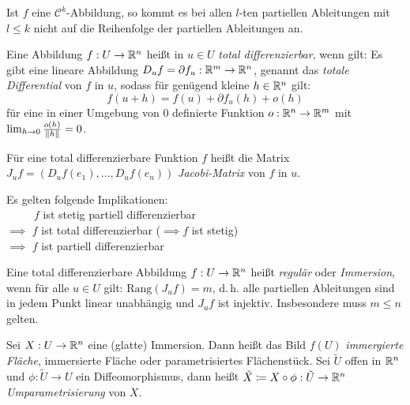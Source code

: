 \documentclass{cheat-sheet}
\begin{document}
\begin{satz}[Schwarz]
  Ist $f$ eine $\mathcal{C}^k$-Abbildung, so kommt es bei allen $l$-ten partiellen Ableitungen mit $l \leq k$ nicht auf die Reihenfolge der partiellen Ableitungen an.
\end{satz}

\begin{defn}
  Eine Abbildung $f : U \to \mathbb{R}^n$ heißt in $u \in U$ \emph{total differenzierbar}, wenn gilt: Es gibt eine lineare Abbildung $D_u f = \partial f_u : \mathbb{R}^m \to \mathbb{R}^n$, genannt das \emph{totale Differential} von $f$ in $u$, sodass für genügend kleine $h \in \mathbb{R}^n$ gilt:
  \[ f(u + h) = f(u) + \partial f_u(h) + o(h) \]
  für eine in einer Umgebung von $0$ definierte Funktion $o : \mathbb{R}^n \to \mathbb{R}^m$ mit $\lim_{h \to 0} \tfrac{o(h)}{\lVert h\rVert} = 0$.
\end{defn}

\begin{defn}
  Für eine total differenzierbare Funktion $f$ heißt die Matrix $J_u f = (D_u f(e_1), ..., D_u f(e_n))$ \emph{Jacobi-Matrix} von $f$ in $u$.
\end{defn}

\begin{bem}
Es gelten folgende Implikationen:\\
$\quad\quad\,\,\, f$ ist stetig partiell differenzierbar\\
$\implies$ $f$ ist total differenzierbar ($\!\implies f$ ist stetig)\\
$\implies$ $f$ ist partiell differenzierbar
\end{bem}


\begin{defn}
  Eine total differenzierbare Abbildung $f : U \to \mathbb{R}^n$ heißt \emph{regulär} oder \emph{Immersion}, wenn für alle $u \in U$ gilt: $\mathrm{Rang}(J_u f) = m$, d.\,h. alle partiellen Ableitungen sind in jedem Punkt linear unabhängig und $J_u f$ ist injektiv. Insbesondere muss $m \leq n$ gelten.
\end{defn}


\begin{defn}
  Sei $X : U \to \mathbb{R}^n$ eine (glatte) Immersion. Dann heißt das Bild $f(U)$ \emph{immergierte Fläche}, immersierte Fläche oder parametrisiertes Flächenstück. Sei $\tilde{U}$ offen in $\mathbb{R}^n$ und $\phi : \tilde{U} \to U$ ein Diffeomorphismus, dann heißt $\tilde{X} \coloneqq X \circ \phi : \tilde{U} \to \mathbb{R}^n$ \emph{Umparametrisierung} von $X$.
\end{defn}
\end{document}

